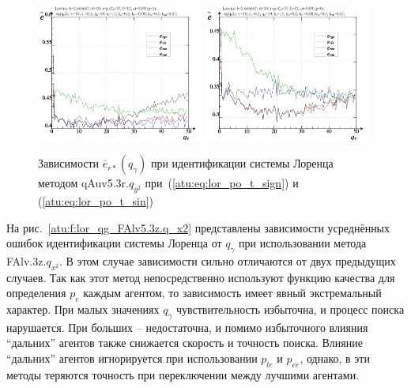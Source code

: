 \begin{figure}[h!]
  \centerline{
    \includegraphics[width=0.49\textwidth]{p/cha/lor/qAuv5.3r/lor_qAuv5_3r_qy2-p_qgamma_e_sign.png}
    \hfill
    \includegraphics[width=0.49\textwidth]{p/cha/lor/qAuv5.3r/lor_qAuv5_3r_qy2-p_qgamma_e_sin.png}
  }
  \caption{Зависимости $\overline{e}_{r*}(q_\gamma)$ при идентификации системы Лоренца методом qAuv5.3r.$q_{y^2}$
   при~(\ref{atu:eq:lor_po_t_sign}) и (\ref{atu:eq:lor_po_t_sin})}
  \label{atu:f:lor_qg_qAuv5.3r.q_y2}
\end{figure}


На рис.~\ref{atu:f:lor_qg_FAlv5.3z.q_x2} представлены зависимости
усреднённых ошибок идентификации системы Лоренца от $q_\gamma$ при использовании метода FAlv.3z.$q_{x^2}$.
В этом случае зависимости сильно отличаются от двух предыдущих случаев.
Так как этот метод непосредственно используют функцию
качества для определения $p_e$ каждым агентом, то зависимость
имеет явный экстремальный характер.
При малых значениях $q_\gamma$ чувствительность избыточна,
и процесс поиска нарушается.
При больших -- недостаточна, и помимо избыточного влияния ``дальних'' агентов также снижается скорость и точность поиска.
Влияние  ``дальних'' агентов игнорируется при использовании
$p_{le}$ и $p_{ee}$, однако,
в эти методы теряются точность при переключении
между лучшими агентами.


